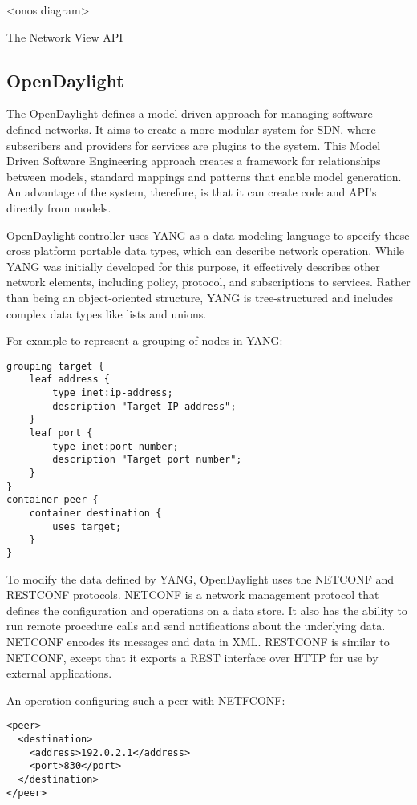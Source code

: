 \documentclass[letterpaper,twocolumn,10pt]{article}
\begin{document}
<onos diagram>

The Network View API

% 
% 
\subsection{OpenDaylight}

The OpenDaylight defines a model driven approach for managing software defined networks. It aims to create a more modular system for SDN, where subscribers and providers for services are plugins to the system. This Model Driven Software Engineering approach creates a framework for relationships between models, standard mappings and patterns that enable model generation. An advantage of the system, therefore, is that it can create code and API's directly from models.\cite{ODL}

OpenDaylight controller uses YANG as a data modeling language to specify these cross platform portable data types, which can describe network operation. While YANG was initially developed for this purpose, it effectively describes other network elements, including policy, protocol, and subscriptions to services. Rather than being an object-oriented structure, YANG is tree-structured and includes complex data types like lists and unions.\cite{yang}

For example to represent a grouping of nodes in YANG:\cite{yang}
\begin{lstlisting}
grouping target {
    leaf address {
        type inet:ip-address;
        description "Target IP address";
    }
    leaf port {
        type inet:port-number;
        description "Target port number";
    }
}
container peer {
    container destination {
        uses target;
    }
}
\end{lstlisting}

To modify the data defined by YANG, OpenDaylight uses the NETCONF and RESTCONF protocols. NETCONF is a network management protocol that defines the configuration and operations on a data store. It also has the ability to run remote procedure calls and send notifications about the underlying data. NETCONF encodes its messages and data in XML. RESTCONF is similar to NETCONF, except that it exports a REST interface over HTTP for use by external applications.\cite{enns2011netconf}

An operation configuring such a peer with NETFCONF:\cite{yang}
\begin{lstlisting}
<peer>
  <destination>
    <address>192.0.2.1</address>
    <port>830</port>
  </destination>
</peer>
\end{lstlisting}
\end{document}
